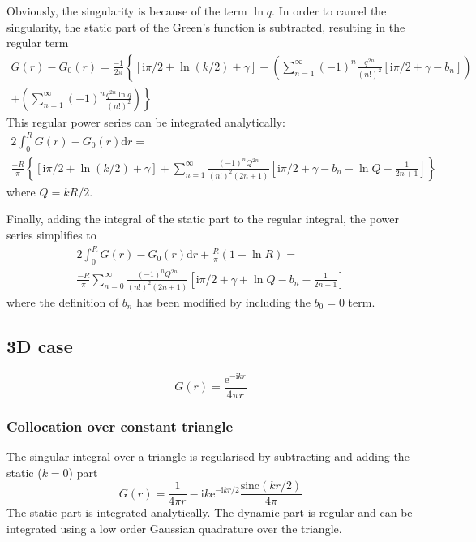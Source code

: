 \documentclass[a4paper,11pt]{article}
\newcommand{\td}{\mathrm{d}}
\newcommand{\te}{\mathrm{e}}
\newcommand{\ti}{\mathrm{i}}
\newcommand{\sinc}{\mathrm{sinc}}
\begin{document}
Obviously, the singularity is because of the term $\ln q$. In order to cancel the singularity, the static part of the Green's function is subtracted, resulting in the regular term
%
\begin{multline}
G(r)-G_0(r) = \frac{-1}{2\pi} \left\{
\left[\ti\pi/2 + \ln \left(k/2\right) +\gamma \right]	
+ 
\left(\sum_{n=1}^{\infty}
(-1)^n \frac{q^{2n}}{\left(n!\right)^2}
\left[\ti\pi/2 + \gamma - b_n \right]	\right) \right. \\
\left.
+
\left(\sum_{n=1}^{\infty}
(-1)^n \frac{q^{2n} \ln q}{\left(n!\right)^2}
\right)
\right\}
\end{multline}
%
This regular power series can be integrated analytically:
%
\begin{multline}
2\int_{0}^{R} G(r)-G_0(r) \td r
= \\
\frac{-R}{\pi} \left\{
\left[\ti\pi/2 + \ln \left(k/2\right) +\gamma \right]
+
\sum_{n=1}^{\infty}
\frac{(-1)^n Q^{2n}}{\left(n!\right)^2\left(2n+1\right)}
\left[\ti\pi/2 + \gamma - b_n + \ln Q - \frac{1}{2n + 1}\right]
\right\}
\end{multline}
%
where $Q = kR/2$.

Finally, adding the integral of the static part to the regular integral, the power series simplifies to
%
\begin{multline}
2\int_{0}^{R} G(r)-G_0(r) \td r + \frac{R}{\pi}\left(1-\ln R\right)
= \\
\frac{-R}{\pi} 
\sum_{n=0}^{\infty}
\frac{(-1)^n Q^{2n}}{\left(n!\right)^2\left(2n+1\right)}
\left[\ti\pi/2 + \gamma + \ln Q - b_n - \frac{1}{2n + 1}\right]
\end{multline}
%
where the definition of $b_n$ has been modified by including the $b_0 = 0$ term.


\subsection{3D case}

\begin{equation}
G(r) = \frac{\te^{-\ti k r}}{4\pi r}
\end{equation}

\subsubsection{Collocation over constant triangle}

The singular integral over a triangle is regularised by subtracting and adding the static ($k = 0$) part
%
\begin{equation}
G(r) = \frac{1}{4\pi r} -\ti k \te^{-\ti k r/2} \frac{\sinc(k r/2)}{4\pi}
\end{equation}
%
The static part is integrated analytically.
The dynamic part is regular and can be integrated using a low order Gaussian quadrature over the triangle.
\end{document}
